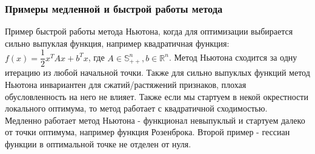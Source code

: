 \subsubsection{Примеры медленной и быстрой работы метода}
Пример быстрой работы метода Ньютона, когда для оптимизации выбирается сильно выпуклая функция, например квадратичная функция: $f(x) = \dfrac{1}{2} x^T A x + b^T x$, где $A \in \mathbb{S}^{n}_{++}, b \in \mathbb{R}^{n}$.
Метод Ньютона сходится за одну итерацию из любой начальной точки.
Также для сильно выпуклых функций метод Ньютона инвариантен для сжатий/растяжений признаков, плохая обусловленность на него не влияет.
Также если мы стартуем в некой окрестности локального оптимума, то метод работает с квадратичной сходимостью. \\
Медленно работает метод Ньютона - функционал невыпуклый и стартуем далеко от точки оптимума, например функция Розенброка.
Второй пример - гессиан функции в оптимальной точке не отделен от нуля.
